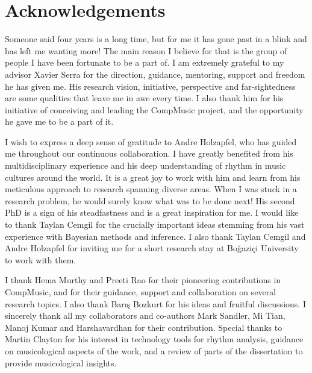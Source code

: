 \chapter*{Acknowledgements}
\vspace*{-1cm}
%
%
%
%
%
Someone said four years is a long time, but for me it has gone past in a blink and has left me wanting more! The main reason I believe for that is the group of people I have been fortunate to be a part of. I am extremely grateful to my advisor Xavier Serra for the direction, guidance, mentoring, support and freedom he has given me. His research vision, initiative, perspective and far-sightedness are some qualities that leave me in awe every time. I also thank him for his initiative of conceiving and leading the CompMusic project, and the opportunity he gave me to be a part of it. 

I wish to express a deep sense of gratitude to Andre Holzapfel, who has guided me throughout our continuous collaboration. I have greatly benefited from his multidisciplinary experience and his deep understanding of rhythm in music cultures around the world. It is a great joy to work with him and learn from his meticulous approach to research spanning diverse areas. When I was stuck in a research problem, he would surely know what was to be done next! His second PhD is a sign of his steadfastness and is a great inspiration for me. I would like to thank Taylan Cemgil for the crucially important ideas stemming from his vast experience with Bayesian methods and inference. I also thank Taylan Cemgil and Andre Holzapfel for inviting me for a short research stay at Boğaziçi University to work with them. %

I thank Hema Murthy and Preeti Rao for their pioneering contributions in CompMusic, and for their guidance, support and collaboration on several research topics. I also thank Barış Bozkurt for his ideas and fruitful discussions. I sincerely thank all my collaborators and co-authors Mark Sandler, Mi Tian, Manoj Kumar and Harshavardhan for their contribution. Special thanks to Martin Clayton for his interest in technology tools for rhythm analysis, guidance on musicological aspects of the work, and a review of parts of the dissertation to provide musicological insights.

